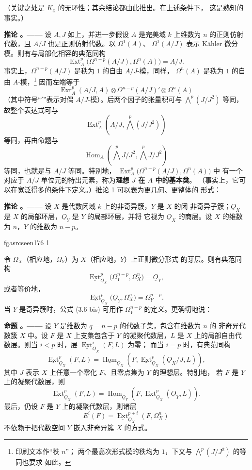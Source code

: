 \documentclass[12pt,twoside,openany]{book}
\numberwithin{equation}{section}
\newcommand{\fgaunitid}{unbound}
\newcommand{\src}[1]{%
  \phantomsection
  \hypertarget{src:\fgaunitid:#1}{}%
  \hypertarget{fga.\fgaunitid.p#1}{}%
  \ifcsname fgasrcseen#1\endcsname\else
    \expandafter\gdef\csname fgasrcseen#1\endcsname{1}%
    \hypertarget{src:#1}{}%
  \fi
  \marginpar{\raggedleft\footnotesize\sffamily #1}%
}
\newcommand{\Osh}{\underline{O}}
\newcommand{\Homsh}{\underline{\operatorname{Hom}}}
\newcommand{\Extsh}{\underline{\operatorname{Ext}}}
\newcommand{\zhterm}[1]{\textbf{#1}}
\theoremstyle{plain}
\theoremstyle{definition}
\theoremstyle{remark}
\newcommand{\result}[2]{%
  \par\medskip\noindent\textbf{#1%
  \if\relax\detokenize{#2}\relax\else\space#2\fi。——}\enspace
}
\begin{document}
（关键之处是 $K_{\underline{x}}$ 的无环性；其余结论都由此推出。在上述条件下，
这是熟知的事实。）

\result{推论}{1} 设 $A,J$ 如上，并进一步假设 $A$ 是完美域 $k$ 上维数为
$n$ 的正则仿射代数，且 $A/J$ 也是正则仿射代数。以 $\Omega^{1}(A)$、
$\Omega^{1}(A/J)$ 表示 Kähler 微分模。则有与局部化相容的典范同构
\begin{equation}\tag{3.5}
  \operatorname{Ext}_{A}^{p}\bigl(\Omega^{n-p}(A/J),\Omega^{n}(A)\bigr)=A/J.
\end{equation}
事实上，$\Omega^{n-p}(A/J)$ 是秩为 $1$ 的自由 $A/J$-模，同样，
$\Omega^{n}(A)$ 是秩为 $1$ 的自由 $A$-模，\footnote{印刷文本作“秩 $n$”；
两个最高次形式模的秩均为 $1$，下文与 $\bigwedge^{p}(J/J^{2})$ 的等同也要求
如此。} 因而左端等于
\[
  \operatorname{Ext}_{A}^{p}(A/J,A)
  \otimes\Omega^{n-p}(A/J)'\otimes\Omega^{n}(A)
\]
（其中符号“$'$”表示对偶 $A/J$-模）。后两个因子的张量积可与
$\bigwedge^{p}(J/J^{2})$ 等同，故整个表达式可与
\[
  \operatorname{Ext}_{A}^{p}\!\left(A/J,\bigwedge^{p}(J/J^{2})\right)
\]
等同，再由命题与
\[
  \operatorname{Hom}_{A}\!\left(\bigwedge^{p}J/J^{2},
  \bigwedge^{p}J/J^{2}\right)
\]
等同，也就是与 $A/J$ 等同。特别地，
$\operatorname{Ext}_{A}^{p}\bigl(\Omega^{n-p}(A/J),\Omega^{n}(A)\bigr)$ 中
有一个对应于 $A/J$ 单位元的特出元素，称为\zhterm{理想 $J$ 在 $A$ 中的基本类}。
（事实上，它可以在宽泛得多的条件下定义。）推论 1 可以表为更几何、更整体的
形式：

\result{推论}{2} 设 $X$ 是代数闭域 $k$ 上的非奇异簇，$Y$ 是 $X$ 的闭
非奇异子簇；$\Osh_X$ 是 $X$ 的局部环层，$\Osh_Y$ 是 $Y$ 的局部环层，并将
它视为 $\Osh_X$ 的商层。设 $X$ 的维数为 $n$，$Y$ 的维数为 $n-p$。

\src{176}
令 $\Omega_X$（相应地，$\Omega_Y$）为 $X$（相应地，$Y$）上正则微分形式
的芽层。则有典范同构
\begin{equation}\tag{3.6}
  \Extsh_{\Osh_X}^{p}\bigl(\Omega_Y^{n-p},\Omega_X^{n}\bigr)=\Osh_Y,
\end{equation}
或者等价地，
\begin{equation}\tag{3.6 bis}
  \Extsh_{\Osh_X}^{p}\bigl(\Osh_Y,\Omega_X^{n}\bigr)=\Omega_Y^{n-p}.
\end{equation}
当 $Y$ 是奇异簇时，公式 (3.6 bis) 可用作 $\Omega_Y^{n-p}$ 的定义。更确切地说：

\result{命题}{5} 设 $Y$ 是维数为 $q=n-p$ 的代数子集，包含在维数为 $n$ 的
非奇异代数簇 $X$ 中。设 $F$ 是 $X$ 上支集包含于 $Y$ 的凝聚代数层，$L$ 是
$X$ 上的局部自由代数层。则当 $i<p$ 时，层 $\Extsh_{\Osh_X}^{i}(F,L)$ 为零；
而当 $i=p$ 时，有典范同构
\begin{equation}\tag{3.7}
  \Extsh_{\Osh_X}^{p}(F,L)
  =\Homsh_{\Osh_X}\!\left(F,
  \Extsh_{\Osh_X}^{p}(\Osh_X/J,L)\right),
\end{equation}
其中 $J$ 表示 $X$ 上任意一个零化 $F$、且零点集为 $Y$ 的理想层。特别地，
若 $F$ 是 $Y$ 上的凝聚代数层，则
\begin{equation}\tag{3.7 bis}
  \Extsh_{\Osh_X}^{p}(F,L)
  =\Homsh_{\Osh_Y}\!\left(F,\Extsh_{\Osh_X}^{p}(\Osh_Y,L)\right).
\end{equation}
最后，仍设 $F$ 是 $Y$ 上的凝聚代数层，则诸层
\[
  E^{i}(F)=\Extsh_{\Osh_X}^{p+i}(F,\Omega_X^{n})
\]
不依赖于把代数空间 $Y$ 嵌入非奇异簇 $X$ 的方式。
\end{document}
